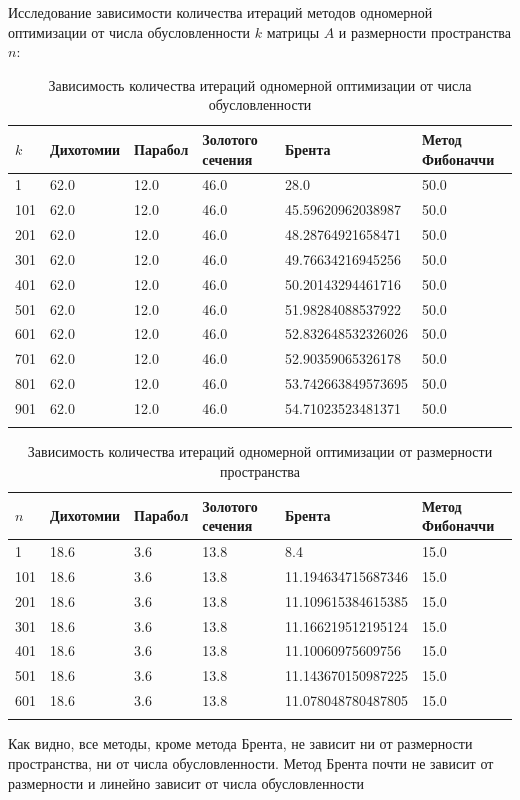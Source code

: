 \documentclass[english]{article}
\begin{document}
Исследование зависимости количества итераций методов одномерной
оптимизации от числа обусловленности \(k\) матрицы \(A\) и размерности
пространства \(n\):
\begin{center}
  \begin{longtable}{l|lllll}
    \(k\) & Дихотомии & Парабол & Золотого сечения & Брента & Метод Фибоначчи \\
    \hline
    1 & 62.0 & 12.0 & 46.0 & 28.0 & 50.0 \\
    101 & 62.0 & 12.0 & 46.0 & 45.59620962038987 & 50.0 \\
    201 & 62.0 & 12.0 & 46.0 & 48.28764921658471 & 50.0 \\
    301 & 62.0 & 12.0 & 46.0 & 49.76634216945256 & 50.0 \\
    401 & 62.0 & 12.0 & 46.0 & 50.20143294461716 & 50.0 \\
    501 & 62.0 & 12.0 & 46.0 & 51.98284088537922 & 50.0 \\
    601 & 62.0 & 12.0 & 46.0 & 52.832648532326026 & 50.0 \\
    701 & 62.0 & 12.0 & 46.0 & 52.90359065326178 & 50.0 \\
    801 & 62.0 & 12.0 & 46.0 & 53.742663849573695 & 50.0 \\
    901 & 62.0 & 12.0 & 46.0 & 54.71023523481371 & 50.0 \\
    \caption{Зависимость количества итераций одномерной оптимизации от числа обусловленности}
  \end{longtable}
\end{center}
\begin{center}
  \begin{longtable}{l|lllll}
    \(n\) & Дихотомии & Парабол & Золотого сечения & Брента & Метод Фибоначчи \\
    \hline
    1 & 18.6 & 3.6 & 13.8 & 8.4 & 15.0 \\
    101 & 18.6 & 3.6 & 13.8 & 11.194634715687346 & 15.0 \\
    201 & 18.6 & 3.6 & 13.8 & 11.109615384615385 & 15.0 \\
    301 & 18.6 & 3.6 & 13.8 & 11.166219512195124 & 15.0 \\
    401 & 18.6 & 3.6 & 13.8 & 11.10060975609756 & 15.0 \\
    501 & 18.6 & 3.6 & 13.8 & 11.143670150987225 & 15.0 \\
    601 & 18.6 & 3.6 & 13.8 & 11.078048780487805 & 15.0 \\
    \caption{Зависимость количества итераций одномерной оптимизации от размерности пространства}
  \end{longtable}
\end{center}
Как видно, все методы, кроме метода Брента, не зависит ни от
размерности пространства, ни от числа обусловленности. Метод Брента
почти не зависит от размерности и линейно зависит от числа
обусловленности
\end{document}
